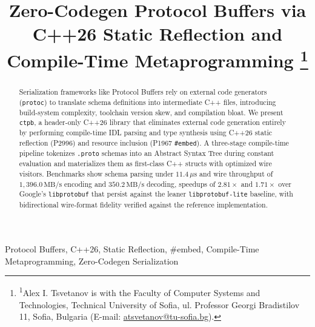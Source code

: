 \documentclass[conference,a4paper]{IEEEtran}
\begin{document}

\title{{\fontsize{21}{14.4}\selectfont
Zero-Codegen Protocol Buffers via C++26 Static Reflection and Compile-Time Metaprogramming}%
\thanks{\textsuperscript{1}Alex I. Tsvetanov is with the Faculty of Computer Systems and Technologies, Technical University of Sofia, ul. Professor Georgi Bradistilov 11, Sofia, Bulgaria (E-mail: \href{mailto:atsvetanov@tu-sofia.bg}{atsvetanov@tu-sofia.bg}).}%
}

\author{
}

\maketitle

\setcounter{page}{1}
\renewcommand{\headrulewidth}{0pt}
\renewcommand{\footrulewidth}{0pt}
\thispagestyle{fancy}
    \fancyfoot[C]{\thepage}

\begin{abstract}
Serialization frameworks like Protocol Buffers rely on external code generators (\texttt{protoc}) to translate schema definitions into intermediate C++ files, introducing build-system complexity, toolchain version skew, and compilation bloat. We present \texttt{ctpb}, a header-only C++26 library that eliminates external code generation entirely by performing compile-time IDL parsing and type synthesis using C++26 static reflection (P2996) and resource inclusion (P1967 \texttt{\#embed}). A three-stage compile-time pipeline tokenizes \texttt{.proto} schemas into an Abstract Syntax Tree during constant evaluation and materializes them as first-class C++ structs with optimized wire visitors. Benchmarks show schema parsing under $11.4\,\mu\text{s}$ and wire throughput of $1{,}396.0\,\text{MB/s}$ encoding and $350.2\,\text{MB/s}$ decoding, speedups of $2.81\times$ and $1.71\times$ over Google's \texttt{libprotobuf} that persist against the leaner \texttt{libprotobuf-lite} baseline, with bidirectional wire-format fidelity verified against the reference implementation.
\end{abstract}

\begin{IEEEkeywords}
Protocol Buffers, C++26, Static Reflection, \#embed, Compile-Time Metaprogramming, Zero-Codegen Serialization
\end{IEEEkeywords}
\end{document}
